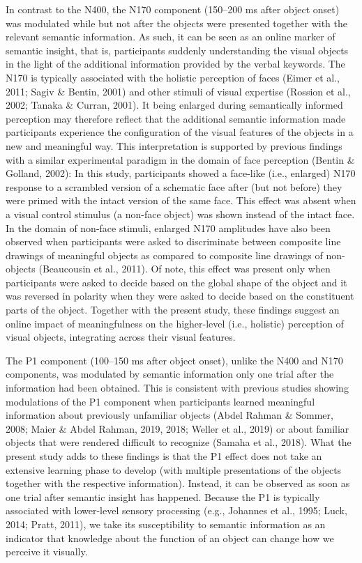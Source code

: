 \documentclass[
  english,
  doc,12pt,twoside,floatsintext]{apa7}
\begin{document}
In contrast to the N400, the N170 component (150--200 ms after object onset) was modulated while but not after the objects were presented together with the relevant semantic information. As such, it can be seen as an online marker of semantic insight, that is, participants suddenly understanding the visual objects in the light of the additional information provided by the verbal keywords. The N170 is typically associated with the holistic perception of faces (Eimer et al., 2011; Sagiv \& Bentin, 2001) and other stimuli of visual expertise (Rossion et al., 2002; Tanaka \& Curran, 2001). It being enlarged during semantically informed perception may therefore reflect that the additional semantic information made participants experience the configuration of the visual features of the objects in a new and meaningful way. This interpretation is supported by previous findings with a similar experimental paradigm in the domain of face perception (Bentin \& Golland, 2002): In this study, participants showed a face-like (i.e., enlarged) N170 response to a scrambled version of a schematic face after (but not before) they were primed with the intact version of the same face. This effect was absent when a visual control stimulus (a non-face object) was shown instead of the intact face. In the domain of non-face stimuli, enlarged N170 amplitudes have also been observed when participants were asked to discriminate between composite line drawings of meaningful objects as compared to composite line drawings of non-objects (Beaucousin et al., 2011). Of note, this effect was present only when participants were asked to decide based on the global shape of the object and it was reversed in polarity when they were asked to decide based on the constituent parts of the object. Together with the present study, these findings suggest an online impact of meaningfulness on the higher-level (i.e., holistic) perception of visual objects, integrating across their visual features.

The P1 component (100--150 ms after object onset), unlike the N400 and N170 components, was modulated by semantic information only one trial after the information had been obtained. This is consistent with previous studies showing modulations of the P1 component when participants learned meaningful information about previously unfamiliar objects (Abdel Rahman \& Sommer, 2008; Maier \& Abdel Rahman, 2019, 2018; Weller et al., 2019) or about familiar objects that were rendered difficult to recognize (Samaha et al., 2018). What the present study adds to these findings is that the P1 effect does not take an extensive learning phase to develop (with multiple presentations of the objects together with the respective information). Instead, it can be observed as soon as one trial after semantic insight has happened. Because the P1 is typically associated with lower-level sensory processing (e.g., Johannes et al., 1995; Luck, 2014; Pratt, 2011), we take its susceptibility to semantic information as an indicator that knowledge about the function of an object can change how we perceive it visually.
\end{document}
